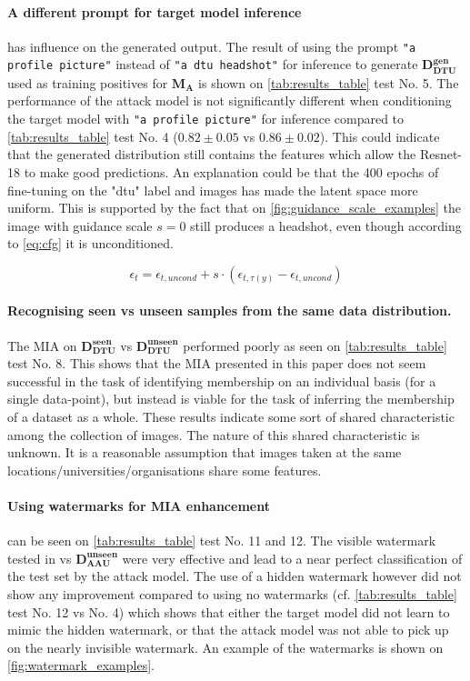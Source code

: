 \paragraph{A different prompt for target model inference}
has influence on the generated output. The result of using the prompt \texttt{"a profile picture"} instead of \texttt{"a dtu headshot"} for inference to generate $\mathbf{D_{DTU}^{gen}}$ used as training positives for $\mathbf{M_A}$ is shown on \cref{tab:results_table} test No. 5. The performance of the attack model is not significantly different when conditioning the target model with \texttt{"a profile picture"} for inference compared to \cref{tab:results_table} test No. 4 ($0.82\pm0.05$ vs $0.86\pm0.02$). This could indicate that the generated distribution still contains the features which allow the Resnet-18 to make good predictions.  An explanation could be that the 400 epochs of fine-tuning on the "dtu" label and images has made the latent space more uniform. This is supported by the fact that on \cref{fig:guidance_scale_examples} the image with guidance scale $s=0$ still produces a headshot, even though according to \cref{eq:cfg} it is unconditioned.

\begin{equation}\label{eq:cfg}
\epsilon_t=\epsilon_{t,uncond} + s \cdot (\epsilon_{t,\tau(y)} - \epsilon_{t,uncond})    
\end{equation}

\paragraph{Recognising seen vs unseen samples from the same data distribution.}

The MIA on $\mathbf{D_{DTU}^{seen}}$ vs $\mathbf{D_{DTU}^{unseen}}$ performed poorly as seen on \cref{tab:results_table} test No. 8. This shows that the MIA presented in this paper does not seem successful in the task of identifying membership on an individual basis (for a single data-point), but instead is viable for the task of inferring the membership of a dataset as a whole. These results indicate some sort of shared characteristic among the collection of images. The nature of this shared characteristic is unknown. It is a reasonable assumption that images taken at the same locations/universities/organisations share some features.

\paragraph{Using watermarks for MIA enhancement}
can be seen on \cref{tab:results_table} test No. 11 and 12. The visible watermark tested in \wmseen vs $\mathbf{D_{AAU}^{unseen}}$ were very effective and lead to a near perfect classification of the test set by the attack model. The use of a hidden watermark however did not show any improvement compared to using no watermarks (cf. \cref{tab:results_table} test No. 12 vs No. 4) which shows that either the target model did not learn to mimic the hidden watermark, or that the attack model was not able to pick up on the nearly invisible watermark.
An example of the watermarks is shown on \cref{fig:watermark_examples}.

